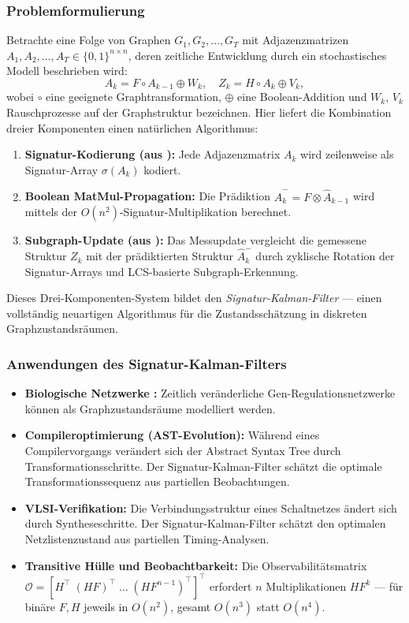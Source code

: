 ﻿\documentclass[a4paper,12pt]{article}
\theoremstyle{definition}
\begin{document}
\subsubsection{Problemformulierung}

Betrachte eine Folge von Graphen $G_1, G_2, \ldots, G_T$ mit Adjazenzmatrizen
$A_1, A_2, \ldots, A_T \in \{0,1\}^{n\times n}$, deren zeitliche Entwicklung
durch ein stochastisches Modell beschrieben wird:
\[
    A_k = F \circ A_{k-1} \oplus W_k, \quad Z_k = H \circ A_k \oplus V_k,
\]
wobei $\circ$ eine geeignete Graphtransformation, $\oplus$ eine Boolean-Addition
und $W_k$, $V_k$ Rauschprozesse auf der Graphstruktur bezeichnen. Hier liefert
die Kombination dreier Komponenten einen natürlichen Algorithmus:
\begin{enumerate}
    \item \textbf{Signatur-Kodierung (aus \cite{epp2026boolmm}):} Jede Adjazenzmatrix
          $A_k$ wird zeilenweise als Signatur-Array $\sigma(A_k)$ kodiert.
    \item \textbf{Boolean MatMul-Propagation:} Die Prädiktion
          $\hat{A}_k^- = F \otimes \hat{A}_{k-1}$ wird mittels der
          $O(n^2)$-Signatur-Multiplikation berechnet.
    \item \textbf{Subgraph-Update (aus \cite{epp2026}):} Das Messupdate vergleicht
          die gemessene Struktur $Z_k$ mit der prädiktierten Struktur $\hat{A}_k^-$
          durch zyklische Rotation der Signatur-Arrays und LCS-basierte Subgraph-Erkennung.
\end{enumerate}
Dieses Drei-Komponenten-System bildet den \emph{Signatur-Kalman-Filter} --- einen
vollständig neuartigen Algorithmus für die Zustandsschätzung in diskreten
Graphzustandsräumen.

\subsubsection{Anwendungen des Signatur-Kalman-Filters}

\begin{itemize}
    \item \textbf{Biologische Netzwerke \cite{epp2026bio}:} Zeitlich veränderliche
          Gen-Regulationsnetzwerke können als Graphzustandsräume modelliert werden.
    \item \textbf{Compileroptimierung (AST-Evolution):} Während eines Compilervorgangs
          verändert sich der Abstract Syntax Tree durch Transformationsschritte.
          Der Signatur-Kalman-Filter schätzt die optimale Transformationssequenz
          aus partiellen Beobachtungen.
    \item \textbf{VLSI-Verifikation:} Die Verbindungsstruktur eines Schaltnetzes
          ändert sich durch Syntheseschritte. Der Signatur-Kalman-Filter schätzt
          den optimalen Netzlistenzustand aus partiellen Timing-Analysen.
    \item \textbf{Transitive Hülle und Beobachtbarkeit:} Die Observabilitätsmatrix
          $\mathcal{O} = [H^\top\; (HF)^\top\; \ldots\; (HF^{n-1})^\top]^\top$
          erfordert $n$ Multiplikationen $HF^k$ --- für binäre $F, H$ jeweils
          in $O(n^2)$, gesamt $O(n^3)$ statt $O(n^4)$.
\end{itemize}
\end{document}

